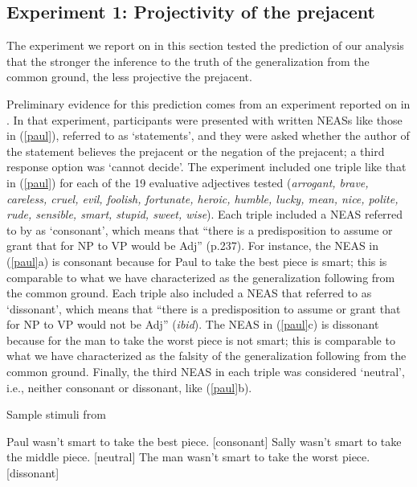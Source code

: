 \documentclass[11pt,fleqn]{article}
\newcommand{\6}{\mbox{$[\hspace*{-.6mm}[$}}
\newcommand{\9}{\mbox{$]\hspace*{-.6mm}]$}}
\begin{document}
\subsection{Experiment 1: Projectivity of the prejacent}\label{s31}

The experiment we report on in this section tested the prediction of our analysis that the stronger the inference to the truth of the generalization from the common ground, the less projective the prejacent.

Preliminary evidence for this prediction comes from an experiment reported on in \citealt{karttunen-etal2014}. In that experiment, participants were presented with written NEASs like those in (\ref{paul}), referred to as `statements', and they were asked whether the author of the statement believes the prejacent or the negation of the prejacent; a third response option was `cannot decide'. The experiment included one triple like that in (\ref{paul}) for each of the 19 evaluative adjectives tested ({\em arrogant, brave, careless, cruel, evil,
foolish, fortunate, heroic, humble, lucky, mean, nice, polite, rude,
sensible, smart, stupid, sweet, wise}). Each triple included a NEAS referred to by \citet{karttunen-etal2014} as `consonant', which means that ``there is a predisposition to assume or grant that for NP to VP would be Adj'' (p.237). For instance, the NEAS in (\ref{paul}a) is consonant because for Paul to take the best piece is smart; this is comparable to what we have characterized as the generalization following from the common ground. Each triple also included a NEAS that \citet{karttunen-etal2014} referred to as `dissonant', which means that ``there is a predisposition to assume or grant that for NP to VP would not be Adj'' ({\em ibid}). The NEAS in (\ref{paul}c) is dissonant because for the man to take the worst piece is not smart; this is comparable to what we have characterized as the falsity of the generalization following from the common ground. Finally, the third NEAS in each triple was considered `neutral', i.e., neither consonant or dissonant, like (\ref{paul}b).

\begin{exe}
\ex\label{paul} Sample stimuli from \citealt[241]{karttunen-etal2014}
\begin{xlist}
\ex Paul wasn't smart to take the best piece. \hfill [consonant]
\ex Sally wasn't smart to take the middle piece.  \hfill [neutral]
\ex The man wasn't smart to take the worst piece. \hfill [dissonant]
\end{xlist}
\end{exe}
\end{document}
